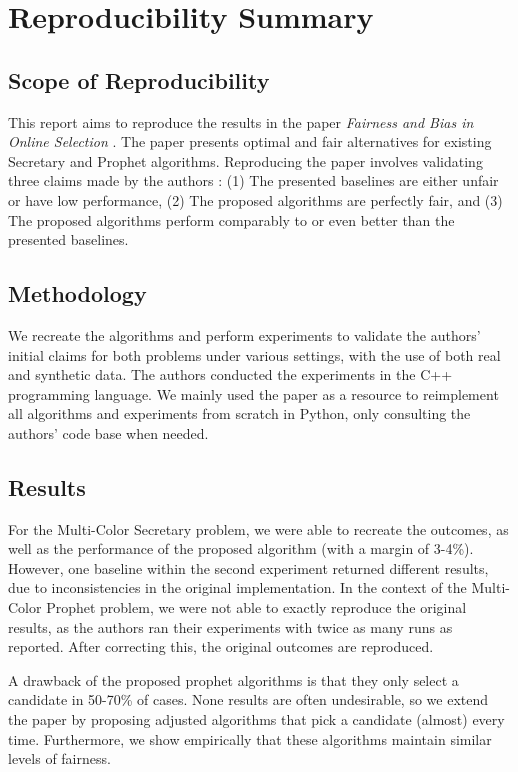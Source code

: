 \section*{\centering Reproducibility Summary}

\subsection*{Scope of Reproducibility}
This report aims to reproduce the results in the paper \textit{Fairness and Bias in Online Selection} \citet{correa21}. The paper presents optimal and fair alternatives for existing Secretary and Prophet algorithms. Reproducing the paper involves validating three claims made by the authors \citet{correa21}: (1) The presented baselines are either unfair or have low performance, (2) The proposed algorithms are perfectly fair, and (3) The proposed algorithms perform comparably to or even better than the presented baselines.

\subsection*{Methodology}

We recreate the algorithms and perform experiments to validate the authors' initial claims for both problems under various settings, with the use of both real and synthetic data. The authors conducted the experiments in the C++ programming language. We mainly used the paper as a resource to reimplement all algorithms and experiments from scratch in Python, only consulting the authors' code base when needed.

\subsection*{Results}

For the Multi-Color Secretary problem, we were able to recreate the outcomes, as well as the performance of the proposed algorithm (with a margin of 3-4\%). However, one baseline within the second experiment returned different results, due to inconsistencies in the original implementation. In the context of the Multi-Color Prophet problem, we were not able to exactly reproduce the original results, as the authors ran their experiments with twice as many runs as reported. After correcting this, the original outcomes are reproduced.

A drawback of the proposed prophet algorithms is that they only select a candidate in 50-70\% of cases. None results are often undesirable, so we extend the paper by proposing adjusted algorithms that pick a candidate (almost) every time. Furthermore, we show empirically that these algorithms maintain similar levels of fairness.

